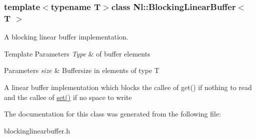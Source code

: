\subsubsection*{template$<$typename T$>$class Nl\-::\-Blocking\-Linear\-Buffer$<$ T $>$}

A blocking linear buffer implementation. 


\begin{DoxyTemplParams}{Template Parameters}
{\em Type} & of buffer elements \\
\hline
\end{DoxyTemplParams}

\begin{DoxyParams}{Parameters}
{\em size} & Buffersize in elements of type T\\
\hline
\end{DoxyParams}
A linear buffer implementation which blocks the callee of get() if nothing to read and the callee of \hyperlink{group__Audio_gacd7c49cb333fc991edae3247d2fb34ef}{set()} if no space to write 

The documentation for this class was generated from the following file\-:\begin{DoxyCompactItemize}
\item 
blockinglinearbuffer.\-h\end{DoxyCompactItemize}
